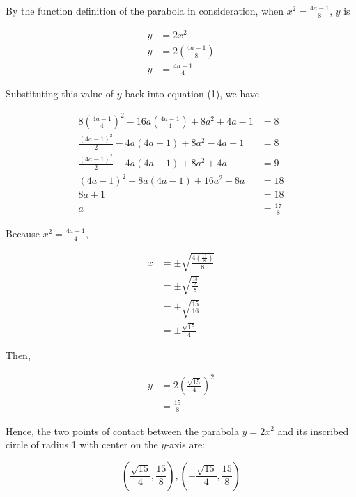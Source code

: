 \documentclass{article}
\begin{document}
    \pagebreak
    \thispagestyle{page14}

    By the function definition of the parabola in consideration, when $x^2 = \frac{4a-1}{8}$, $y$ is

    \begin{align*}
        y   &= 2x^2 \\
        y   &= 2\left(\frac{4a-1}{8}\right) \\
        y   &= \frac{4a-1}{4}
    \end{align*}

    Substituting this value of $y$ back into equation (1), we have

    \begin{align*}
        8\left(\frac{4a-1}{4}\right)^2 - 16a\left(\frac{4a-1}{4}\right) + 8a^2 + 4a - 1 &= 8 \\
        \frac{(4a-1)^2}{2} - 4a(4a-1) + 8a^2 - 4a - 1                                   &= 8 \\
        \frac{(4a-1)^2}{2} - 4a(4a-1) + 8a^2 + 4a                                       &= 9 \\
        (4a-1)^2 - 8a(4a-1) + 16a^2 + 8a                                                &= 18 \\
        8a + 1                                                                          &= 18 \\
        a                                                                               &= \frac{17}{8}
    \end{align*}

    Because $x^2 = \frac{4a-1}{4}$,

    \begin{align*}
        x   &= \pm \sqrt{\frac{4\left(\frac{17}{8}\right)}{8}} \\
            &= \pm \sqrt{\frac{\frac{15}{2}}{8}} \\
            &= \pm \sqrt{\frac{15}{16}} \\
            &= \pm \frac{\sqrt{15}}{4}
    \end{align*}

    Then,

    \begin{align*}
        y   &= 2\left(\frac{\sqrt{15}}{4}\right)^2 \\
            &= \frac{15}{8}
    \end{align*}

    Hence, the two points of contact between the parabola $y=2x^2$ and its inscribed circle of radius 1 with center on the $y$-axis are:

    \[
        \left(\frac{\sqrt{15}}{4}, \frac{15}{8}\right), \left(-\frac{\sqrt{15}}{4}, \frac{15}{8}\right)
    \]
\end{document}
